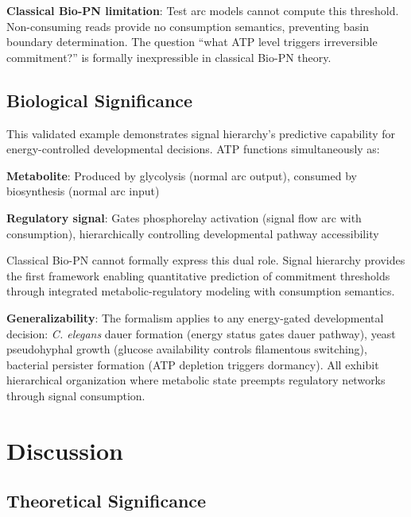 \documentclass[twocolumn,11pt]{article}
\begin{document}
\vspace{3pt}
\noindent\textbf{Classical Bio-PN limitation}: Test arc models cannot compute this threshold. Non-consuming reads provide no consumption semantics, preventing basin boundary determination. The question ``what ATP level triggers irreversible commitment?'' is formally inexpressible in classical Bio-PN theory.

\subsection{Biological Significance}

\vspace{3pt}
\noindent This validated example demonstrates signal hierarchy's predictive capability for energy-controlled developmental decisions. ATP functions simultaneously as:

\vspace{3pt}
\noindent\textbf{Metabolite}: Produced by glycolysis (normal arc output), consumed by biosynthesis (normal arc input)

\vspace{3pt}
\noindent\textbf{Regulatory signal}: Gates phosphorelay activation (signal flow arc with consumption), hierarchically controlling developmental pathway accessibility

\vspace{3pt}
\noindent Classical Bio-PN cannot formally express this dual role. Signal hierarchy provides the first framework enabling quantitative prediction of commitment thresholds through integrated metabolic-regulatory modeling with consumption semantics.

\vspace{3pt}
\noindent\textbf{Generalizability}: The formalism applies to any energy-gated developmental decision: \textit{C. elegans} dauer formation (energy status gates dauer pathway), yeast pseudohyphal growth (glucose availability controls filamentous switching), bacterial persister formation (ATP depletion triggers dormancy). All exhibit hierarchical organization where metabolic state preempts regulatory networks through signal consumption.

\section{Discussion}

\subsection{Theoretical Significance}
\end{document}
